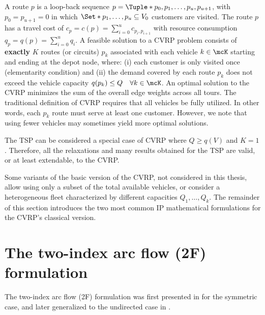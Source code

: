 A route $p$ is a loop-back sequence $p = \Tuple*{p_0, p_1, \dots, p_u, p_{u + 1}}$,
with $p_0 = p_{u + 1} = 0$
in which $\Set*{p_1, \dots, p_u} \subseteq V_0$ customers are visited.
The route $p$ has a travel cost of $c_p = c(p) = \sum_{i=0}^{u} c_{p_i,p_{i+1}}$
with resource consumption $q_p = q(p) = \sum_{i=0}^{u} q_{i}$.
A feasible solution to a CVRP problem consists of \textbf{exactly} $K$ routes (or circuits) $p_k$
associated with each vehicle $k \in \mcK$ starting and ending at the depot node,
where:
(i) each customer is only visited once (elementarity condition)
and (ii) the demand covered by each route $p_k$ does not exceed the vehicle capacity $q(p_k) \le Q \quad \forall k \in \mcK$.
An optimal solution to the CVRP minimizes the sum of the overall edge weights across all tours.
The traditional definition of CVRP requires that all vehicles be fully utilized.
In other words, each $p_k$ route must serve at least one customer.
However, we note that using fewer vehicles may sometimes yield more optimal solutions.

\medskip

The TSP can be considered a special case of CVRP where $Q \ge q(V)$ and $K = 1$.
Therefore, all the relaxations and many results obtained for the TSP
are valid, or at least extendable, to the CVRP.

\medskip

Some variants of the basic version of the CVRP,
not considered in this thesis,
allow using only a subset of the total available vehicles,
or consider a heterogeneous fleet characterized by different capacities $Q_1, \dots, Q_k$.
The remainder of this section
introduces the two most common IP mathematical formulations for the CVRP's classical version.

\section{The two-index arc flow (2F) formulation}
\label{sec:cvrp-two-index-flow-formulation}

The two-index arc flow (2F) formulation
was  first presented in \textcite{laporte1983, laporte1985} for the symmetric case,
and later generalized to the undirected case in \textcite{laporte1986}.


